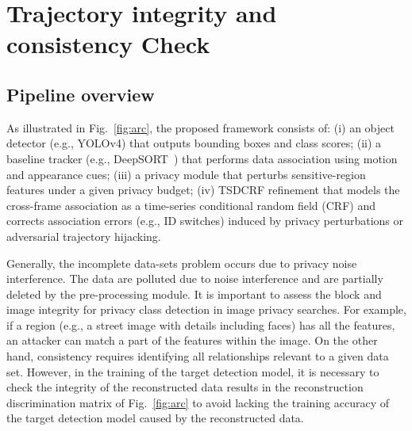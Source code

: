 \documentclass[trans]{IEEEtran}
\begin{document}
\section{Trajectory integrity and consistency Check}
\subsection{Pipeline overview}
As illustrated in Fig.~\ref{fig:arc}, the proposed framework consists of: (i) an object detector (e.g., YOLOv4) that outputs bounding boxes and class scores; (ii) a baseline tracker (e.g., DeepSORT~\cite{theagarajan2020automated}) that performs data association using motion and appearance cues; (iii) a privacy module that perturbs sensitive-region features under a given privacy budget; (iv) TSDCRF refinement that models the cross-frame association as a time-series conditional random field (CRF) and corrects association errors (e.g., ID switches) induced by privacy perturbations or adversarial trajectory hijacking.

Generally, the incomplete data-sets problem occurs due to privacy noise interference. The data are polluted due to noise interference and are partially deleted by the pre-processing module. It is important to assess the block and image integrity for privacy class detection in image privacy searches. For example, if a region (e.g., a street image with details including faces) has all the features, an attacker can match a part of the features within the image. On the other hand, consistency requires identifying all relationships relevant to a given data set. However, in the training of the target detection model, it is necessary to check the integrity of the reconstructed data results in the reconstruction discrimination matrix of Fig.~\ref{fig:arc} to avoid lacking the training accuracy of the target detection model caused by the reconstructed data.
\end{document}
